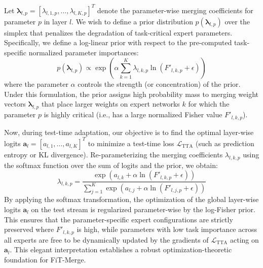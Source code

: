 \documentclass{article}
\theoremstyle{plain}
\theoremstyle{definition}
\theoremstyle{remark}
\begin{document}
Let $\boldsymbol{\lambda}_{l,p} = [\lambda_{l,1,p}, \dots, \lambda_{l,K,p}]^T$ denote the parameter-wise merging coefficients for parameter $p$ in layer $l$. We wish to define a prior distribution $p(\boldsymbol{\lambda}_{l,p})$ over the simplex that penalizes the degradation of task-critical expert parameters. Specifically, we define a log-linear prior with respect to the pre-computed task-specific normalized parameter importances:
$$p(\boldsymbol{\lambda}_{l,p}) \propto \exp \left( \alpha \sum_{k=1}^K \lambda_{l,k,p} \ln (F'_{l,k,p} + \epsilon) \right)$$
where the parameter $\alpha$ controls the strength (or concentration) of the prior. Under this formulation, the prior assigns high probability mass to merging weight vectors $\boldsymbol{\lambda}_{l,p}$ that place larger weights on expert networks $k$ for which the parameter $p$ is highly critical (i.e., has a large normalized Fisher value $F'_{l,k,p}$).

Now, during test-time adaptation, our objective is to find the optimal layer-wise logits $\mathbf{a}_l = [a_{l,1}, \dots, a_{l,K}]^T$ to minimize a test-time loss $\mathcal{L}_{\text{TTA}}$ (such as prediction entropy or KL divergence). Re-parameterizing the merging coefficients $\lambda_{l,k,p}$ using the softmax function over the sum of logits and the prior, we obtain:
$$\lambda_{l,k,p} = \frac{\exp\left( a_{l,k} + \alpha \ln(F'_{l,k,p} + \epsilon) \right)}{\sum_{j=1}^K \exp\left( a_{l,j} + \alpha \ln(F'_{l,j,p} + \epsilon) \right)}$$
By applying the softmax transformation, the optimization of the global layer-wise logits $\mathbf{a}_l$ on the test stream is regularized parameter-wise by the log-Fisher prior. This ensures that the parameter-specific expert configurations are strictly preserved where $F'_{l,k,p}$ is high, while parameters with low task importance across all experts are free to be dynamically updated by the gradients of $\mathcal{L}_{\text{TTA}}$ acting on $\mathbf{a}_l$. This elegant interpretation establishes a robust optimization-theoretic foundation for FiT-Merge.
\end{document}
